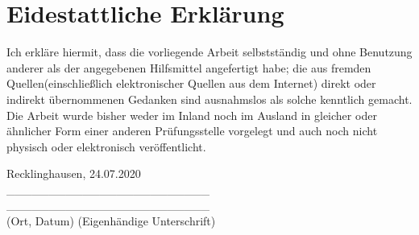 \newpage
{} %

\section*{Eidestattliche Erklärung}
Ich erkläre hiermit, dass die vorliegende Arbeit selbstständig und ohne Benutzung anderer als der angegebenen Hilfsmittel angefertigt habe; die aus fremden Quellen(einschließlich elektronischer Quellen aus dem Internet) direkt oder indirekt übernommenen Gedanken sind ausnahmslos als solche kenntlich gemacht. Die Arbeit wurde bisher weder im Inland noch im Ausland in gleicher oder ähnlicher Form einer anderen Prüfungsstelle vorgelegt und auch noch nicht physisch oder elektronisch veröffentlicht.

\par\medskip
\par\medskip
Recklinghausen, 24.07.2020 \hspace{1.7cm}
 \\
\_\_\_\_\_\_\_\_\_\_\_\_\_\_\_\_\_\_\_\_\_\_\_\_ \hspace{1.5cm}
\_\_\_\_\_\_\_\_\_\_\_\_\_\_\_\_\_\_\_\_\_\_\_\_ \\

(Ort, Datum)\hspace{4.5cm}
(Eigenhändige Unterschrift)
